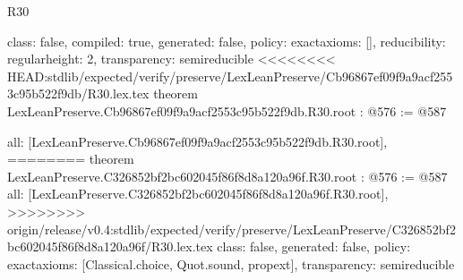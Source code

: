 \begin{lexlean}{R30}
\begin{coremodule}
{{{{{  class: false,
  compiled: true,
  generated: false,
  policy: exact{axioms: []},
  reducibility: regular{height: 2},
  transparency: semireducible
}
<<<<<<<< HEAD:stdlib/expected/verify/preserve/LexLeanPreserve/Cb96867ef09f9a9acf2553c95b522f9db/R30.lex.tex
theorem LexLeanPreserve.Cb96867ef09f9a9acf2553c95b522f9db.R30.root : @576 := @587 {
  all: [LexLeanPreserve.Cb96867ef09f9a9acf2553c95b522f9db.R30.root],
========
theorem LexLeanPreserve.C326852bf2bc602045f86f8d8a120a96f.R30.root : @576 := @587 {
  all: [LexLeanPreserve.C326852bf2bc602045f86f8d8a120a96f.R30.root],
>>>>>>>> origin/release/v0.4:stdlib/expected/verify/preserve/LexLeanPreserve/C326852bf2bc602045f86f8d8a120a96f/R30.lex.tex
  class: false,
  generated: false,
  policy: exact{axioms: [Classical.choice, Quot.sound, propext]},
  transparency: semireducible
}

}}}}}
\end{coremodule}
\end{lexlean}
